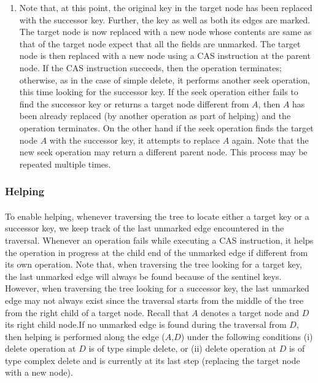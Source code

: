 \begin{enumerate}
\item Note that, at this point, the original key in the target node has been replaced with the successor key. Further, the key as well as both its edges are marked. The target node is now replaced with a new node whose contents are same as that of the target node expect that all the fields are unmarked. The target node is then replaced with a new node using a CAS instruction at the parent node. If the CAS instruction succeeds, then the operation terminates; otherwise, as in the case of simple delete, it performs another seek operation, this time looking for the successor key. If the seek operation either fails to find the successor key or returns a target node different from $A$, then $A$ has been already replaced (by another operation as part of helping) and the operation terminates. On the other hand if the seek operation finds the target node $A$ with the successor key, it attempts to replace $A$ again. Note that the new seek operation may return a different parent node. This process may be repeated multiple times.
\end{enumerate}

\subsubsection{Helping} \paragraph{}
To enable helping, whenever traversing the tree to locate either a target key or a successor key, we keep track of the last unmarked edge encountered in the traversal. Whenever an operation fails while executing a CAS instruction, it helps the operation in progress at the child end of the unmarked edge if different from its own operation. Note that, when traversing the tree looking for a target key, the last unmarked edge will always be found because of the sentinel keys. However, when traversing the tree looking for a successor key, the last unmarked edge may not always exist since the traversal starts from the middle of the tree from the right child of a target node. Recall that $A$ denotes a target node and $D$ its right child node.If no unmarked edge is found during the traversal from $D$, then helping is performed along the edge ($A$,$D$) under the following conditions (i) delete operation at $D$ is of type simple delete, or (ii) delete operation at $D$ is of type complex delete and is currently at its last step (replacing the target node with a new node).
